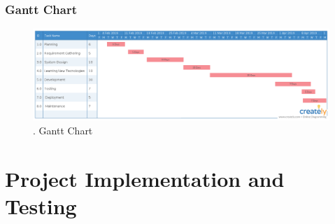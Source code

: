 \documentclass{article}
\begin{document}
\begin{flushleft}
            \subsubsection{Gantt Chart}
            \begin{figure}[!ht]
              
              \includegraphics[width=12cm]{GanttChart.jpg}
              \renewcommand{\thefigure}{ \thesubsection.\arabic{figure}}
              \caption{ .  Gantt Chart}
            \end{figure}
            
            \newpage
            
    \section{Project Implementation and Testing}

\end{flushleft}
\end{document}

